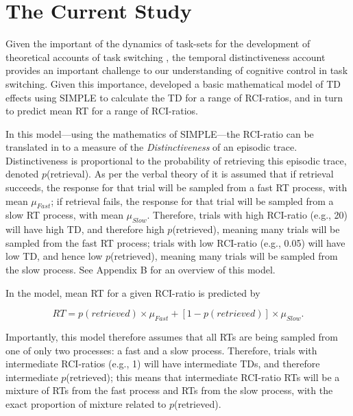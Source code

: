 \documentclass[a4paper, jou, natbib]{apa6}
\begin{document}
\section{The Current Study}

Given the important of the dynamics of task-sets for the development of theoretical accounts of task switching \citep[e.g.,][]{Altmann2008, Schneider2005}, the temporal distinctiveness account provides an important challenge to our understanding of cognitive control in task switching. Given this importance, \cite{Grange2015} developed a basic mathematical model of TD effects using SIMPLE \citep{Brown2007} to calculate the TD for a range of RCI-ratios, and in turn to predict mean RT for a range of RCI-ratios. 

In this model---using the mathematics of SIMPLE---the RCI-ratio can be translated in to a measure of the \emph{Distinctiveness} of an episodic trace. Distinctiveness is proportional to the probability of retrieving this episodic trace, denoted $p$(retrieval). As per the verbal theory of \cite{Horoufchin2011a} it is assumed that if retrieval succeeds, the response for that trial will be sampled from a fast RT process, with mean $\mu_{Fast}$; if retrieval fails, the response for that trial will be sampled from a slow RT process, with mean $\mu_{Slow}$. Therefore, trials with high RCI-ratio (e.g., 20) will have high TD, and therefore high $p$(retrieved), meaning many trials will be sampled from the fast RT process; trials with low RCI-ratio (e.g., 0.05) will have low TD, and hence low $p$(retrieved), meaning many trials will be sampled from the slow process. See Appendix B for an overview of this model.  

In the model, mean RT for a given RCI-ratio is predicted by

\begin{equation}
RT = p(retrieved) \times \mu_{Fast} + [1 - p(retrieved)] \times \mu_{Slow}.
\label{eq:simpleMixture}
\end{equation}

Importantly, this model therefore assumes that all RTs are being sampled from one of only two processes: a fast and a slow process. Therefore, trials with intermediate RCI-ratios (e.g., 1) will have intermediate TDs, and therefore intermediate $p$(retrieved); this means that intermediate RCI-ratio RTs will be a mixture of RTs from the fast process and RTs from the slow process, with the exact proportion of mixture related to $p$(retrieved). 
    
\end{document}
